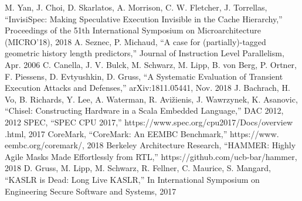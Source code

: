 \begin{thebibliography}{00}
     M. Yan, J. Choi, D. Skarlatos, A. Morrison, C. W. Fletcher, J. Torrellas, ``InvisiSpec: Making Speculative Execution Invisible in the Cache Hierarchy,'' Proceedings of the 51th International Symposium on Microarchitecture (MICRO’18), 2018
     A. Seznec, P. Michaud, ``A case for (partially)-tagged geometric history length predictors,'' Journal of Instruction Level Parallelism, Apr. 2006
     C. Canella, J. V. Bulck, M. Schwarz, M. Lipp, B. von Berg, P. Ortner, F. Piessens, D. Evtyushkin, D. Gruss, ``A Systematic Evaluation of Transient Execution Attacks and Defenses,'' arXiv:1811.05441, Nov. 2018
     J. Bachrach, H. Vo, B. Richards, Y. Lee, A. Waterman, R. Avižienis, J. Wawrzynek, K. Asanovic, ``Chisel: Constructing Hardware in a Scala Embedded Language,'' DAC 2012, 2012
     SPEC, ``SPEC CPU 2017,'' https://www.spec.org/cpu2017/Docs/overview .html, 2017
     CoreMark, ``CoreMark: An EEMBC Benchmark,'' https://www. eembc.org/coremark/, 2018
     Berkeley Architecture Research, ``HAMMER: Highly Agile Masks Made Effortlessly from RTL,'' https://github.com/ucb-bar/hammer, 2018
     D. Gruss, M. Lipp, M. Schwarz, R. Fellner, C. Maurice, S. Mangard, ``KASLR is Dead: Long Live KASLR,'' In International Symposium on Engineering Secure Software and Systems, 2017
\end{thebibliography}

